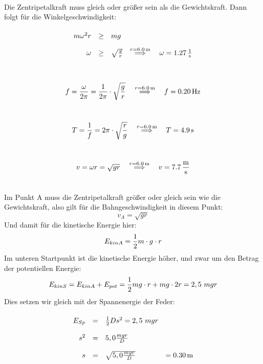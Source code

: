 \documentclass[a4paper]{article}
\begin{document}
\vspace{0.5 cm}

\\
Die Zentripetalkraft muss gleich oder größer sein als die Gewichtskraft. Dann folgt für die Winkelgeschwindigkeit:
$$
\renewcommand{\arraystretch}{2}
\begin{array}{rcll}
m \omega^2 r &\ge& m g \\
\omega &\ge& \sqrt{g \over r}  & \stackrel{r=\SI{6,0}{\meter}}{\Longrightarrow} \quad \omega = \SI{1,27}{1 \over s}
\end{array}
$$
\vspace{0.5 cm}

\\
$$f = {\omega \over 2 \pi } = {1 \over 2 \pi } \cdot \sqrt{g \over r} \quad \stackrel{r=\SI{6,0}{\meter}}{\Longrightarrow} \quad f =  \SI{0,20}{\hertz}$$
\vspace{0.5 cm}

\\
$$ T = {1\over f} = 2\pi \cdot \sqrt{r \over g} \quad \stackrel{r=\SI{6,0}{\meter}}{\Longrightarrow} \quad T = \SI{4,9}{\second}$$
\vspace{0.5 cm}

\\
$$ v = \omega r = \sqrt{gr} \quad \stackrel{r=\SI{6,0}{\meter}}{\Longrightarrow} \quad v = \SI{7,7}{\meter\over\second}$$
\vspace{0.5 cm}

\\
Im Punkt A muss die Zentripetalkraft größer oder gleich sein wie die Gewichtskraft, also gilt für die Bahngeschwindigkeit in diesem Punkt:
$$v_A = \sqrt{gr}$$
Und damit für die kinetische Energie hier:
$$E_{kinA}={1 \over 2 } m\cdot g \cdot r$$
Im unteren Startpunkt ist die kinetische Energie höher, und zwar um den Betrag der potentiellen Energie:
$$E_{kinS}=E_{kinA}+E_{pot}={1 \over 2 } m g \cdot r +  m g\cdot 2r= 2,5 ~m g r $$
Dies setzen wir gleich mit der Spannenergie der Feder:
$$
\renewcommand{\arraystretch}{2}
\begin{array}{rcll}
E_{Sp}&=&{1\over 2} D s^2 = 2,5 ~mgr\\
s^2 &=& 5,0 {mgr \over D} \\
s &=& \sqrt{5,0 {mgr \over D}}  &= \SI{0,30}{\meter}
\end{array}
$$
\vspace{0.5 cm}
\end{document}
